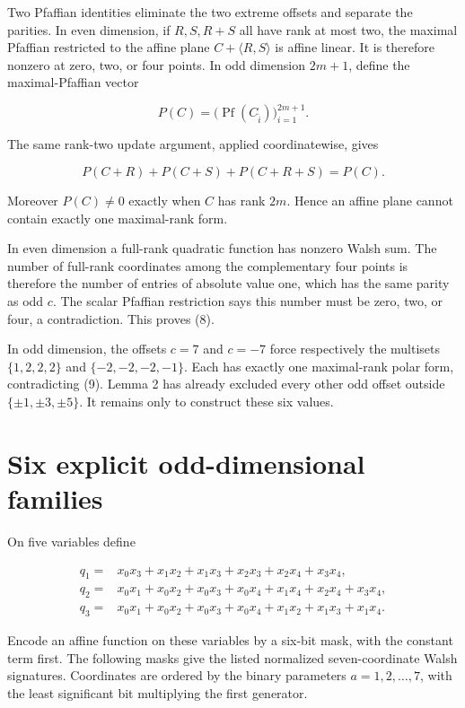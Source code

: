 \documentclass[11pt]{article}
\begin{document}
Two Pfaffian identities eliminate the two extreme offsets and separate the parities. In even
dimension, if $R,S,R+S$ all have rank at most two, the maximal Pfaffian restricted to the affine
plane $C+\langle R,S\rangle$ is affine linear. It is therefore nonzero at zero, two, or four
points. In odd dimension $2m+1$, define the maximal-Pfaffian vector

\[
P(C)=\bigl(\operatorname{Pf}(C_{\widehat i})\bigr)_{i=1}^{2m+1}.
\]

The same rank-two update argument, applied coordinatewise, gives

\[
P(C+R)+P(C+S)+P(C+R+S)=P(C).
\tag{9}
\]

Moreover $P(C)\ne0$ exactly when $C$ has rank $2m$. Hence an affine plane cannot contain exactly
one maximal-rank form.

In even dimension a full-rank quadratic function has nonzero Walsh sum. The number of full-rank
coordinates among the complementary four points is therefore the number of entries of absolute
value one, which has the same parity as odd $c$. The scalar Pfaffian restriction says this number
must be zero, two, or four, a contradiction. This proves (8).

In odd dimension, the offsets $c=7$ and $c=-7$ force respectively the multisets
$\{1,2,2,2\}$ and $\{-2,-2,-2,-1\}$. Each has exactly one maximal-rank polar form, contradicting
(9). Lemma 2 has already excluded every other odd offset outside
$\{\pm1,\pm3,\pm5\}$. It remains only to construct these six values.

\section{Six explicit odd-dimensional families}


On five variables define

\[
\begin{aligned}
q_1={}&x_0x_3+x_1x_2+x_1x_3+x_2x_3+x_2x_4+x_3x_4,\\
q_2={}&x_0x_1+x_0x_2+x_0x_3+x_0x_4+x_1x_4+x_2x_4+x_3x_4,\\
q_3={}&x_0x_1+x_0x_2+x_0x_3+x_0x_4+x_1x_2+x_1x_3+x_1x_4.
\end{aligned}
\tag{10}
\]

Encode an affine function on these variables by a six-bit mask, with the constant term first.
The following masks give the listed normalized seven-coordinate Walsh signatures. Coordinates are
ordered by the binary parameters $a=1,2,\ldots,7$, with the least significant bit multiplying the
first generator.
\end{document}
